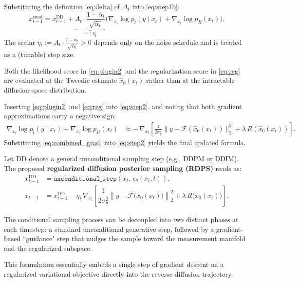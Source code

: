 \documentclass[a4paper,11pt]{article}
\renewcommand{\varepsilon}{\epsilon}
\theoremstyle{definition}
\theoremstyle{plain}
\theoremstyle{remark}
\begin{document}
Substituting the definition \eqref{eq:delta} of $\Delta_t$ into \eqref{eq:step1b}:
\begin{equation}
    x_{t-1}^{\text{cond}}
    = x_{t-1}^{\mathrm{DD}}
    + \underbrace{A_t \cdot \frac{1-\bar{\alpha}_t}{\sqrt{\bar{\alpha}_t}}}_{\displaystyle=:\,\eta_t}
      \Big(
          \nabla_{x_t}\log p_t(y \mid x_t)
          + \nabla_{x_t}\log p_R(x_t)
      \Big).
    \label{eq:step2}
\end{equation}
The scalar $\eta_t := A_t \cdot \frac{1-\bar{\alpha}_t}{\sqrt{\bar{\alpha}_t}} > 0$
depends only on the noise schedule and is treated as a (tunable) step size.


Both the likelihood score in \eqref{eq:plugin2} and the regularization score in \eqref{eq:reg} are evaluated at the
Tweedie estimate $\hat{x}_0(x_t)$ rather than at the intractable diffusion-space
distribution.

Inserting \eqref{eq:plugin2} and \eqref{eq:reg} into \eqref{eq:step2},
and noting that both gradient approximations carry a negative sign:
\begin{align}
    \nabla_{x_t}\log p_t(y \mid x_t) + \nabla_{x_t}\log p_R(x_t)
    &\approx
    -\,\nabla_{x_t}\!\left[
        \frac{1}{2\sigma_y^2}\|y-\mathcal{F}(\hat{x}_0(x_t))\|_2^2
        + \lambda\,R(\hat{x}_0(x_t))
    \right].
    \label{eq:combined_grad}
\end{align}
Substituting \eqref{eq:combined_grad} into \eqref{eq:step2} yields the final updated formula.

Let DD denote a general unconditional sampling step (e.g., DDPM or DDIM). The proposed \textbf{regularized diffusion posterior sampling (RDPS)} reads as:
\begin{align}
    x_{t-1}^{\mathrm{DD}} &= \texttt{unconditional\_step}\!\left(x_t,\,\varepsilon_\theta(x_t,t)\right), \label{eq:rdps} \\%
    x_{t-1} &= x_{t-1}^{\mathrm{DD}} - \eta_t\,\nabla_{x_t}\!\left[ \dfrac{1}{2\sigma_y^2} \left\|y - \mathcal{F}\big(\hat{x}_0(x_t)\big)\right\|_2^2 + \lambda\,R\big(\hat{x}_0(x_t)\big) \right]. 
    \label{eq:rdps_2}
\end{align}


The conditional sampling process can be decoupled into two distinct phases at each timestep: a standard unconditional generative step, followed by a gradient-based ``guidance" step that nudges the sample toward the measurement manifold and the regularized subspace. 

This formulation essentially embeds a single step of gradient descent on a regularized variational objective directly into the reverse diffusion trajectory.
\end{document}
